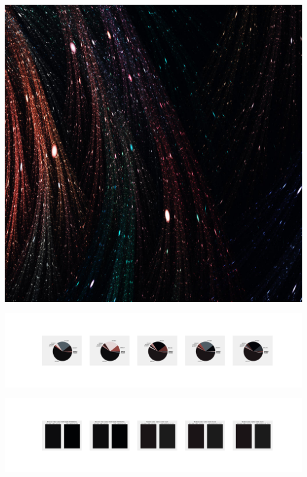 \documentclass[11pt]{article}
\begin{document}
\begin{landscape}
    \begin{center}
    \includegraphics[width=\textwidth]{./nbimg/file (110).jpg}
    \end{center}

    \begin{center}
    \includegraphics[width=250mm]{./nbimg/pie-13.jpg}
    \end{center}

    \begin{center}
    \includegraphics[width=250mm]{./nbimg/peak-13.jpg}
    \end{center}
    


\end{landscape}
\end{document}
